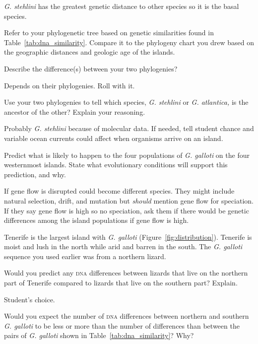 \documentclass[12pt, hidelinks]{exam}
\newcommand*\AnswerBox[2]{%
    \parbox[t][#1]{0.92\textwidth}{%
    \begin{solution}#2\end{solution}}
    \vspace{\stretch{1}}
}
\begin{document}
\begin{questions}
\AnswerBox{2\baselineskip}{\textit{G. stehlini} has the greatest genetic distance to other species so it is the basal species.}

Refer to your phylogenetic tree based on genetic similarities found in Table~\ref{tab:dna_similarity}. Compare it to the phylogeny chart you drew based on the geographic distances and geologic age of the islands. 

\question Describe the difference(s) between your two phylogenies? 

\AnswerBox{2\baselineskip}{Depends on their phylogenies. Roll with it.}

\question
Use your two phylogenies to tell which species, \textit{G. stehlini} or \textit{G. atlantica,} is the ancestor of the other? Explain your reasoning. 

\AnswerBox{3\baselineskip}{Probably \textit{G. stehlini} because of molecular data. If needed, tell student chance and variable ocean currents could affect when organisms arrive on an island.}

\question
Predict what is likely to happen to the four populations of \textit{G. galloti} on the four westernmost islands. State what evolutionary conditions will support this prediction, and why.

\AnswerBox{3\baselineskip}{If gene flow is disrupted could become different species. They might include natural selection, drift, and mutation but \emph{should} mention gene flow for speciation. If they say gene flow is high so no speciation, ask them if there would be genetic differences among the island populations if gene flow is high.}

\newpage

Tenerife is the largest island with \textit{G. galloti} (Figure~\ref{fig:distribution}). Tenerife is moist and lush in the north while arid and barren in the south. The \textit{G. galloti} sequence you used earlier was from a northern lizard. 

\question
Would you predict any \textsc{dna} differences between lizards that live on the northern part of Tenerife compared to lizards that live on the southern part? Explain.

\AnswerBox{2\baselineskip}{Student's choice.}

\question
Would you expect the number of \textsc{dna} differences between northern and southern \textit{G. galloti} to be less or more than the number of differences than between the pairs of \textit{G. galloti} shown in Table~\ref{tab:dna_similarity}? Why?


\end{questions}
\end{document}
